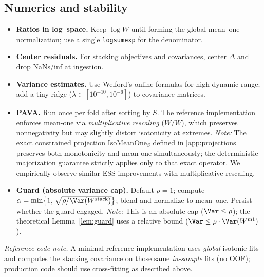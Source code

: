 \subsection{Numerics and stability}
\label{app:impl-numerics}
\begin{itemize}[leftmargin=*,itemsep=2pt,topsep=2pt]
\item \textbf{Ratios in log–space.} Keep $\log W$ until forming the global mean–one normalization; use a single \texttt{logsumexp} for the denominator.
\item \textbf{Center residuals.} For stacking objectives and covariances, center $\Delta$ and drop NaNs/inf at ingestion.
\item \textbf{Variance estimates.} Use Welford’s online formulas for high dynamic range; add a tiny ridge ($\lambda\!\in\![10^{-10},10^{-6}]$) to covariance matrices.
\item \textbf{PAVA.} Run once per fold after sorting by $S$. The reference implementation enforces mean-one via \emph{multiplicative rescaling} ($W/\bar W$), which preserves nonnegativity but may slightly distort isotonicity at extremes. \emph{Note:} The exact constrained projection $\mathrm{IsoMeanOne}_S$ defined in \cref{app:projections} preserves both monotonicity and mean-one simultaneously; the deterministic majorization guarantee strictly applies only to that exact operator. We empirically observe similar ESS improvements with multiplicative rescaling.
\item \textbf{Guard (absolute variance cap).} Default $\rho{=}1$; compute $\alpha=\min\!\big\{1,\, \sqrt{\rho/\Var(W^{\mathrm{stack}})}\big\}$; blend and normalize to mean–one. Persist whether the guard engaged. \emph{Note:} This is an absolute cap ($\Var\le\rho$); the theoretical Lemma~\ref{lem:guard} uses a relative bound ($\Var\le\rho\cdot\Var(W^{\mathrm{m1}})$).
\end{itemize}
\emph{Reference code note.} A minimal reference implementation uses \emph{global} isotonic fits and computes the stacking covariance on those same \emph{in-sample} fits (no OOF); production code should use cross-fitting as described above.

